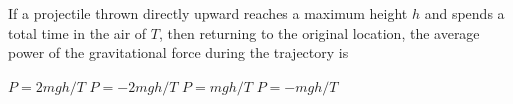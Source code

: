 \documentclass{../../oss-apphys-exam}
\begin{document}
\genheader


\genmultidirections

\gengravity

\raggedcolumns
\begin{multicols*}{2}
  \begin{questions}

%
%      
%
%    
    
    \question If a projectile thrown directly upward reaches a maximum height
    $h$ and spends a total time in the air of $T$, then returning to the
    original location, the average power of the gravitational force during the
    trajectory is
    \begin{choices}
      \choice $P=2mgh/T$
      \choice $P=-2mgh/T$
      \choice $P=mgh/T$
      \choice $P=-mgh/T$
    \end{choices}
    

\end{questions}
\end{multicols*}
\end{document}
